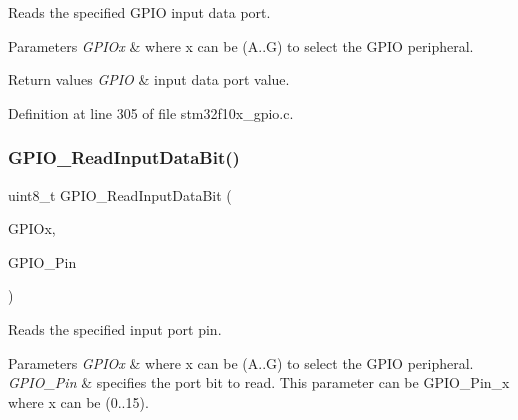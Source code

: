 Reads the specified G\+P\+IO input data port. 


\begin{DoxyParams}{Parameters}
{\em G\+P\+I\+Ox} & where x can be (A..G) to select the G\+P\+IO peripheral. \\
\hline
\end{DoxyParams}

\begin{DoxyRetVals}{Return values}
{\em G\+P\+IO} & input data port value. \\
\hline
\end{DoxyRetVals}


Definition at line 305 of file stm32f10x\+\_\+gpio.\+c.

\mbox{\label{group___g_p_i_o___private___functions_ga98772ef6b639b3fa06c8ae5ba28d3aaa}} 
\subsubsection{\texorpdfstring{G\+P\+I\+O\+\_\+\+Read\+Input\+Data\+Bit()}{GPIO\_ReadInputDataBit()}}
{\footnotesize\ttfamily uint8\+\_\+t G\+P\+I\+O\+\_\+\+Read\+Input\+Data\+Bit (\begin{DoxyParamCaption}\item[{\hyperlink{struct_g_p_i_o___type_def}{G\+P\+I\+O\+\_\+\+Type\+Def} $\ast$}]{G\+P\+I\+Ox,  }\item[{uint16\+\_\+t}]{G\+P\+I\+O\+\_\+\+Pin }\end{DoxyParamCaption})}



Reads the specified input port pin. 


\begin{DoxyParams}{Parameters}
{\em G\+P\+I\+Ox} & where x can be (A..G) to select the G\+P\+IO peripheral. \\
\hline
{\em G\+P\+I\+O\+\_\+\+Pin} & specifies the port bit to read. This parameter can be G\+P\+I\+O\+\_\+\+Pin\+\_\+x where x can be (0..15). \\
\hline
\end{DoxyParams}

